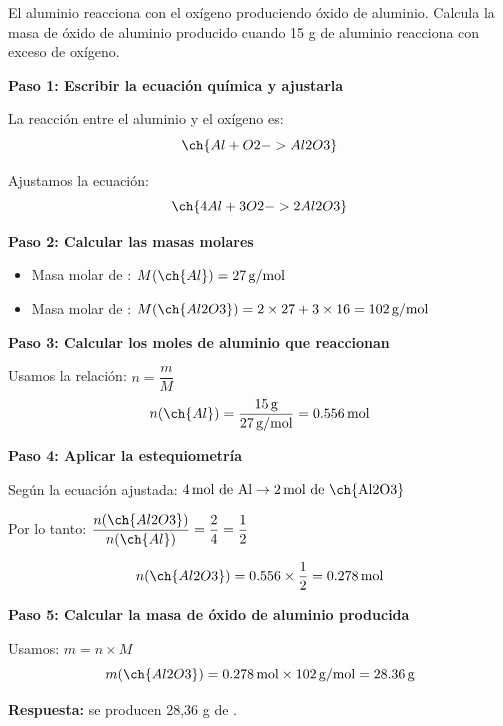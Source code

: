 \begin{exercise}
    El aluminio reacciona con el oxígeno produciendo óxido de aluminio.
    Calcula la masa de óxido de aluminio producido cuando 15 g de aluminio reacciona con exceso de oxígeno.
    \begin{solu}
        \textbf{Paso 1: Escribir la ecuación química y ajustarla}

        La reacción entre el aluminio y el oxígeno es:
        \begin{equation*}
            \ch{Al + O2 -> Al2O3}
        \end{equation*}

        Ajustamos la ecuación:
        \begin{equation*}
            \ch{4 Al + 3 O2 -> 2 Al2O3}
        \end{equation*}

        \textbf{Paso 2: Calcular las masas molares}

        \begin{itemize}
            \item Masa molar de : $M(\ch{Al}) = 27\,\text{g/mol}$
            \item Masa molar de : $M(\ch{Al2O3}) = 2 \times 27 + 3 \times 16 = 102\,\text{g/mol}$
        \end{itemize}

        \textbf{Paso 3: Calcular los moles de aluminio que reaccionan}

        Usamos la relación: $n = \dfrac{m}{M}$
        \begin{equation*}
            n(\ch{Al}) = \frac{15\,\text{g}}{27\,\text{g/mol}} = 0.556\,\text{mol}
        \end{equation*}

        \textbf{Paso 4: Aplicar la estequiometría}

        Según la ecuación ajustada: $4\,\text{mol de Al} \rightarrow 2\,\text{mol de \ch{Al2O3}}$

        Por lo tanto: $\dfrac{n(\ch{Al2O3})}{n(\ch{Al})} = \dfrac{2}{4} = \dfrac{1}{2}$

        \begin{equation*}
            n(\ch{Al2O3}) = 0.556 \times \frac{1}{2} = 0.278\,\text{mol}
        \end{equation*}

        \textbf{Paso 5: Calcular la masa de óxido de aluminio producida}

        Usamos: $m = n \times M$
        \begin{equation*}
            m(\ch{Al2O3}) = 0.278\,\text{mol} \times 102\,\text{g/mol} = 28.36\,\text{g}
        \end{equation*}

        \textbf{Respuesta:} se producen 28,36 g de .
    \end{solu}
\end{exercise}


